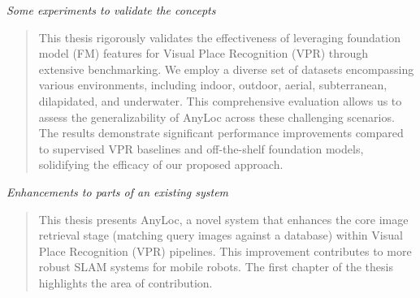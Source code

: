 \documentclass[11pt]{article}
\begin{document}
    \begin{minipage}{\textwidth}
    {\it Some experiments to validate the concepts}
    \vspace{-2mm}
    \begin{quotation}
        \noindent
        This thesis rigorously validates the effectiveness of
        leveraging foundation model (FM) features for Visual Place
        Recognition (VPR) through extensive benchmarking. We employ a
        diverse set of datasets encompassing various environments,
        including indoor, outdoor, aerial, subterranean, dilapidated,
        and underwater. This comprehensive evaluation allows us to
        assess the generalizability of AnyLoc across these challenging
        scenarios. The results demonstrate significant performance
        improvements compared to supervised VPR baselines and
        off-the-shelf foundation models, solidifying the efficacy of
        our proposed approach. 
    \end{quotation}
    \end{minipage}
    \vspace{2mm}

    \begin{minipage}{\textwidth}
    {\it Enhancements to parts of an existing system}
    \vspace{-2mm}
    \begin{quotation}
        \noindent
        This thesis presents AnyLoc, a novel system that enhances the
        core image retrieval stage (matching query images against a
        database) within Visual Place Recognition (VPR) pipelines.
        This improvement contributes to more robust SLAM systems for
        mobile robots. The first chapter of the thesis highlights the
        area of contribution.
    \end{quotation}
    \end{minipage}

\end{document}
